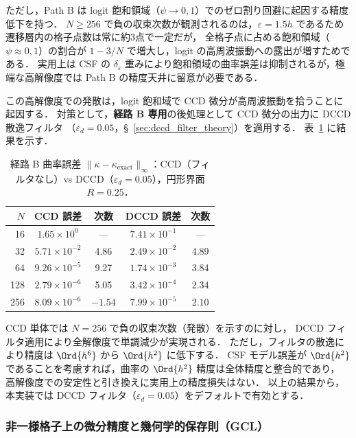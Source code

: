 ただし，Path B は logit 飽和領域（$\psi \to 0,1$）でのゼロ割り回避に起因する精度低下を持つ．
$N \geq 256$ で負の収束次数が観測されるのは，$\varepsilon = 1.5h$ であるため遷移層内の格子点数は常に約3点で一定だが，
全格子点に占める飽和領域（$\psi \approx 0,1$）の割合が $1 - 3/N$ で増大し，logit の高周波振動への露出が増すためである．
実用上は CSF の $\delta_\varepsilon$ 重みにより飽和領域の曲率誤差は抑制されるが，極端な高解像度では Path B の精度天井に留意が必要である．

この高解像度での発散は，logit 飽和域で CCD 微分が高周波振動を拾うことに起因する．
対策として，\textbf{経路 B 専用}の後処理として CCD 微分の出力に DCCD 散逸フィルタ
（$\varepsilon_d = 0.05$，§~\ref{sec:dccd_filter_theory}）を適用する．
表~\ref{tab:curvature_dccd_comparison} に結果を示す．

\begin{table}[htbp]
\centering
\caption{経路 B 曲率誤差 $\|\kappa - \kappa_{\mathrm{exact}}\|_\infty$：CCD（フィルタなし）vs DCCD（$\varepsilon_d = 0.05$），円形界面 $R=0.25$．}
\label{tab:curvature_dccd_comparison}
\begin{tabular}{rcccc}
\toprule
$N$ & CCD 誤差 & 次数 & DCCD 誤差 & 次数 \\
\midrule
16  & $1.65 \times 10^{0}$  & ---   & $7.41 \times 10^{-1}$ & --- \\
32  & $5.71 \times 10^{-2}$ & 4.86  & $2.49 \times 10^{-2}$ & 4.89 \\
64  & $9.26 \times 10^{-5}$ & 9.27  & $1.74 \times 10^{-3}$ & 3.84 \\
128 & $2.79 \times 10^{-6}$ & 5.05  & $3.42 \times 10^{-4}$ & 2.34 \\
256 & $8.09 \times 10^{-6}$ & $-1.54$ & $7.99 \times 10^{-5}$ & $2.10$ \\
\bottomrule
\end{tabular}
\end{table}

CCD 単体では $N = 256$ で負の収束次数（発散）を示すのに対し，
DCCD フィルタ適用により全解像度で単調減少が実現される．
ただし，フィルタの散逸により精度は $\Ord{h^6}$ から $\Ord{h^2}$ に低下する．
CSF モデル誤差が $\Ord{h^2}$ であることを考慮すれば，曲率の $\Ord{h^2}$ 精度は全体精度と整合的であり，
高解像度での安定性と引き換えに実用上の精度損失はない．
以上の結果から，本実装では DCCD フィルタ（$\varepsilon_d = 0.05$）をデフォルトで有効とする．

\subsubsection{非一様格子上の微分精度と幾何学的保存則（GCL）}
\label{sec:gcl_verification}


